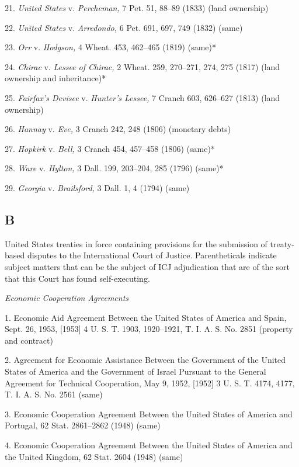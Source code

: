     21. \emph{United States} v. \emph{Percheman,} 7 Pet. 51, 88--89 (1833)
    (land ownership)

    22. \emph{United States} v. \emph{Arredondo,} 6 Pet. 691, 697, 749
    (1832) (same)

    23. \emph{Orr} v. \emph{Hodgson,} 4 Wheat. 453, 462--465 (1819)
    (same)*

    24. \emph{Chirac} v. \emph{Lessee of Chirac,} 2 Wheat. 259, 270--271,
    274, 275 (1817) (land ownership and inheritance)*

    25. \emph{Fairfax's Devisee} v. \emph{Hunter's Lessee,} 7 Cranch
    603, 626--627 (1813) (land ownership)

    26. \emph{Hannay} v. \emph{Eve,} 3 Cranch 242, 248 (1806) (monetary
    debts)

    27. \emph{Hopkirk} v. \emph{Bell,} 3 Cranch 454, 457--458 (1806)
    (same)*

    28. \emph{Ware} v. \emph{Hylton,} 3 Dall. 199, 203--204, 285 (1796)
    (same)*

    29. \emph{Georgia} v. \emph{Brailsford,} 3 Dall. 1, 4 (1794) (same)

\subsection{B}

  United States treaties in force containing provisions for the
submission of treaty-based disputes to the International Court of
Justice. Parentheticals indicate subject matters \newpage  that can be the
subject of ICJ adjudication that are of the sort that this Court has
found self-executing.

\emph{Economic Cooperation Agreements}

    1. Economic Aid Agreement Between the United States of America and
    Spain, Sept. 26, 1953, [1953] 4 U. S. T. 1903, 1920--1921, T. I. A.
    S. No. 2851 (property and contract)

    2. Agreement for Economic Assistance Between the Government of the
    United States of America and the Government of Israel Pursuant to
    the General Agreement for Technical Cooperation, May 9, 1952, [1952]
    3 U. S. T. 4174, 4177, T. I. A. S. No. 2561 (same)

    3. Economic Cooperation Agreement Between the United States of
    America and Portugal, 62 Stat. 2861--2862 (1948) (same)

    4. Economic Cooperation Agreement Between the United States of
    America and the United Kingdom, 62 Stat. 2604 (1948) (same)

